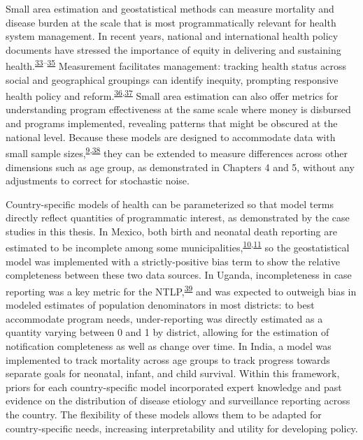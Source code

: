 \documentclass[
]{article}
\begin{document}
Small area estimation and geostatistical methods can measure mortality and disease burden at the scale that is most programmatically relevant for health system management. In recent years, national and international health policy documents have stressed the importance of equity in delivering and sustaining health.\textsuperscript{\protect\hyperlink{ref-IND_MOHFW2017}{33}--\protect\hyperlink{ref-Buyum2020}{35}} Measurement facilitates management: tracking health status across social and geographical groupings can identify inequity, prompting responsive health policy and reform.\textsuperscript{\protect\hyperlink{ref-Roberts2008}{36},\protect\hyperlink{ref-Frenk2006}{37}} Small area estimation can also offer metrics for understanding program effectiveness at the same scale where money is disbursed and programs implemented, revealing patterns that might be obscured at the national level. Because these models are designed to accommodate data with small sample sizes,\textsuperscript{\protect\hyperlink{ref-Wakefield2019}{9},\protect\hyperlink{ref-Diggle2016}{38}} they can be extended to measure differences across other dimensions such as age group, as demonstrated in Chapters 4 and 5, without any adjustments to correct for stochastic noise.

Country-specific models of health can be parameterized so that model terms directly reflect quantities of programmatic interest, as demonstrated by the case studies in this thesis. In Mexico, both birth and neonatal death reporting are estimated to be incomplete among some municipalities,\textsuperscript{\protect\hyperlink{ref-Hernandez2012}{10},\protect\hyperlink{ref-Enciso2017}{11}} so the geostatistical model was implemented with a strictly-positive bias term to show the relative completeness between these two data sources. In Uganda, incompleteness in case reporting was a key metric for the NTLP,\textsuperscript{\protect\hyperlink{ref-UgandaNationalTuberculosisandLeprosyProgramme2020}{39}} and was expected to outweigh bias in modeled estimates of population denominators in most districts: to best accommodate program needs, under-reporting was directly estimated as a quantity varying between 0 and 1 by district, allowing for the estimation of notification completeness as well as change over time. In India, a model was implemented to track mortality across age groups to track progress towards separate goals for neonatal, infant, and child survival. Within this framework, priors for each country-specific model incorporated expert knowledge and past evidence on the distribution of disease etiology and surveillance reporting across the country. The flexibility of these models allows them to be adapted for country-specific needs, increasing interpretability and utility for developing policy.
\end{document}
